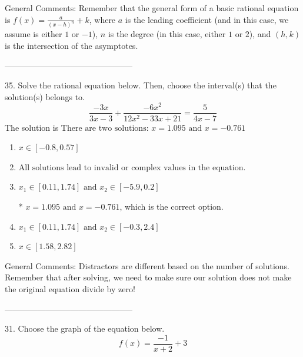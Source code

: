 \documentclass{article}[14pt]
\begin{document}
General Comments: Remember that the general form of a basic rational equation is $ f(x) = \frac{a}{(x-h)^n} + k$, where $a$ is the leading coefficient (and in this case, we assume is either $1$ or $-1$), $n$ is the degree (in this case, either $1$ or $2$), and $(h, k)$ is the intersection of the asymptotes.

-----------------------------------------------

35. Solve the rational equation below. Then, choose the interval(s) that the solution(s) belongs to.
$$ \frac{-3x}{3x -3} + \frac{-6x^{2}}{12x^{2} -33 x + 21} = \frac{5}{4x -7} $$ 
The solution is $ \text{There are two solutions: } x = 1.095 \text{ and } x = -0.761 $ 

\begin{enumerate}[label=\Alph*.] 
\item $ x \in [-0.8,0.57] $ 

  
\item $ \text{All solutions lead to invalid or complex values in the equation.} $ 

  
\item $ x_1 \in [0.11, 1.74] \text{ and } x_2 \in [-5.9,0.2] $ 

 * $x = 1.095 \text{ and } x = -0.761$, which is the correct option. 
\item $ x_1 \in [0.11, 1.74] \text{ and } x_2 \in [-0.3,2.4] $ 

  
\item $ x \in [1.58,2.82] $ 

  
\end{enumerate} 
 
General Comments: Distractors are different based on the number of solutions. Remember that after solving, we need to make sure our solution does not make the original equation divide by zero!

-----------------------------------------------

31. Choose the graph of the equation below.
$$ f(x) = \frac{-1}{x + 2} + 3 $$ 
\end{document}
